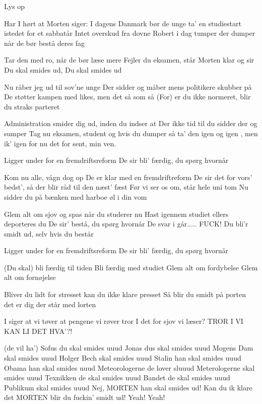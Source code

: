 \documentclass[a4paper,11pt]{article}
\begin{document}
\begin{song}
\scene Lys op

 Har I hørt at Morten siger:
I dagens Danmark bør de unge ta'
en studiestart istedet for et sabbatår
Intet overskud fra dovne Robert i dag
tumper der dumper når de bør bestå deres fag

Tar den med ro, når de bør læse mere
Fejler du eksamen, står Morten klar og sir
Du skal smides ud, Du skal smides ud

Nu råber jeg ud til sov'ne unge
Der sidder og måber mens politikere skubber på
De støtter kampen med likes, men det så som så
(For) er du ikke normeret, blir du straks parteret

Administration smider dig ud, inden du indser at
Der ikke tid til du sidder der og sumper
Tag nu eksamen, student og hvis du dumper
så ta' den igen og igen , men ik' igen
for nu det for sent, min ven.

Ligger under for en fremdriftsreform
De sir bli' færdig, du spørg hvornår

Kom nu alle, vågn dog op
De er klar med en fremdriftreform
De sir det for vors' bedst', så der blir råd til den næst' fæst
Før vi ser os om, står hele uni tom
Nu sidder du på bænken med harboe øl i din vom

Glem alt om sjov og spas når du studerer nu
Hast igennem studiet ellers deporteres du
De sir' bestå, du spørg hvornår
De svar i går.....  FUCK!
Du bli'r smidt ud, selv hvis du består

Ligger under for en fremdriftsreform
De sir bli' færdig, du spørg hvornår

(Du skal) bli færdig til tiden
Bli færdig med studiet
Glem alt om fordybelse
Glem alt om fornøjelse

Bliver du lidt for stresset
kan du ikke klare presset
Så blir du smidt på porten
det er dig der står med lorten

I siger at vi tøver
at pengene vi røver
tror I det for sjov vi læser?
TROR I VI KAN LI DET HVA'?!

(de vil ha')
Sofus du skal smides uuud
Jonas dus skal smides uuud
Mogens Dam skal smides uuud
Holger Bech skal smides uuud
Stalin han skal smides uuud
Obama han skal smides uuud
Meteorologerne de lover sluuud
Meterologerne skal smides uuud
Texnikken de skal smides uuud
Bandet de skal smides uuud
Publikum skal smides uuud
Nej, MORTEN han skal smides ud!
Kan du ik klare det MORTEN blir du fuckin' smidt ud!
Yeah!
Yeah!

\end{song}
\end{document}
